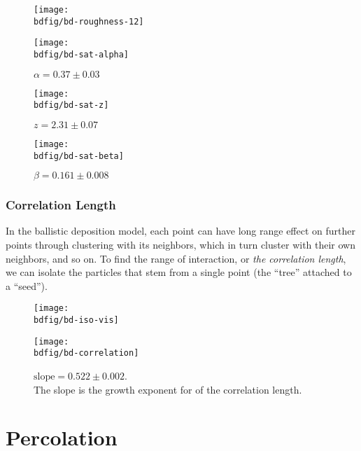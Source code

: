 \documentclass[12pt,a4paper]{article}
\newcommand{\bdfig}{../fig/ballistic-deposition}
\begin{document}
    \begin{figure}
        \centering
        \texttt{[image: \\bdfig/bd-roughness-12]}
    \end{figure}
    \begin{figure}
        \centering
        \texttt{[image: \\bdfig/bd-sat-alpha]}
        \caption{$\alpha = 0.37\pm0.03$}
    \end{figure}
    \begin{figure}
        \centering
        \texttt{[image: \\bdfig/bd-sat-z]}
        \caption{$z = 2.31\pm0.07$}
    \end{figure}
    \begin{figure}
        \centering
        \texttt{[image: \\bdfig/bd-sat-beta]}
        \caption{$\beta = 0.161\pm0.008$}
    \end{figure}
    \restoregeometry
    \subsubsection{Correlation Length}
    In the ballistic deposition model, each point can have long range effect on further points through clustering with
    its neighbors, which in turn cluster with their own neighbors, and so on. To find the range of interaction, or
    \emph{the correlation length}, we can isolate the particles that stem from a single point
    (the \enquote{tree} attached to a \enquote{seed}).
    \begin{figure}
        \centering
        \texttt{[image: \\bdfig/bd-iso-vis]}
    \end{figure}
    \begin{figure}
        \centering
        \texttt{[image: \\bdfig/bd-correlation]}
        \caption{$\text{slope} = 0.522\pm0.002$.\\The slope is the growth exponent for of the correlation length.}
    \end{figure}
    \section{Percolation}
\end{document}
